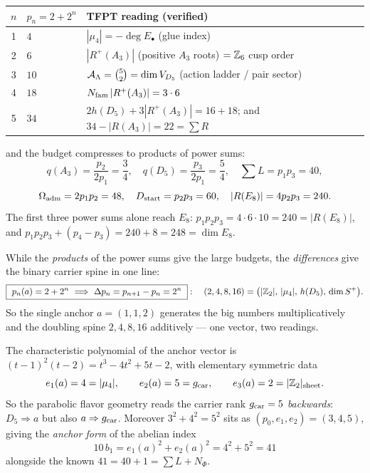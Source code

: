 \begin{center}\small
\renewcommand{\arraystretch}{1.2}
\begin{tabularx}{\linewidth}{@{}clY@{}}
\toprule
$n$ & $p_n=2+2^n$ & \textbf{TFPT reading (verified)} \\
 & $4$ & $|\mu_4|=-\deg E_\bullet$ (glue index) \\
2 & $6$ & $|R^+(A_3)|$ (positive $A_3$ roots) $=\mathbb{Z}_6$ cusp order \\
3 & $10$ & $\mathcal A_\Lambda=\binom52=\dim V_{D_5}$ (action ladder / pair sector) \\
4 & $18$ & $N_{\mathrm{fam}}\,|R^+(A_3)|=3\cdot6$ \\
5 & $34$ & $2h(D_5)+3|R^+(A_3)|=16+18$; and $34-|R(A_3)|=22=\sum R$ \\
\bottomrule
\end{tabularx}
\end{center}

\noindent and the budget compresses to products of power sums:
\[
  q(A_3)=\frac{p_2}{2p_1}=\frac34,\quad q(D_5)=\frac{p_3}{2p_1}=\frac54,\quad
  \textstyle\sum L=p_1p_3=40,
\]
\[
  \Omega_{\mathrm{adm}}=2p_1p_2=48,\quad D_{\mathrm{start}}=p_2p_3=60,\quad |R(E_8)|=4p_2p_3=240.
\]
The first three power sums alone reach $E_8$: $p_1p_2p_3=4\cdot6\cdot10=240=|R(E_8)|$, and
$p_1p_2p_3+(p_4-p_3)=240+8=248=\dim E_8$.

\begin{winbox}
While the \emph{products} of the power sums give the large budgets, the \emph{differences} give the
binary carrier spine in one line:
\[
  \boxed{\ p_n(a)=2+2^n\ \Longrightarrow\ \Delta p_n=p_{n+1}-p_n=2^n\ }:\quad
  (2,4,8,16)=\bigl(|\Z_2|,\,|\mu_4|,\,h(D_5),\,\dim S^+\bigr).
\]
So the single anchor $a=(1,1,2)$ generates the big numbers multiplicatively and the doubling spine
$2,4,8,16$ additively --- one vector, two readings.
\end{winbox}

\begin{winbox}
The characteristic polynomial of the anchor vector is $(t-1)^2(t-2)=t^3-4t^2+5t-2$, with elementary
symmetric data
\[
  e_1(a)=4=|\mu_4|,\qquad e_2(a)=5=g_{\mathrm{car}},\qquad e_3(a)=2=|\mathbb{Z}_2|_{\mathrm{sheet}} .
\]
So the parabolic flavor geometry reads the carrier rank $g_{\mathrm{car}}=5$ \emph{backwards}: $D_5\Rightarrow a$ but
also $a\Rightarrow g_{\mathrm{car}}$. Moreover $3^2+4^2=5^2$ sits as $(p_0,e_1,e_2)=(3,4,5)$, giving the
\emph{anchor form} of the abelian index
\[
  \boxed{\ 10\,b_1=e_1(a)^2+e_2(a)^2=4^2+5^2=41\ }
\]
alongside the known $41=40+1=\sum L+N_\Phi$. \mE
\end{winbox}

